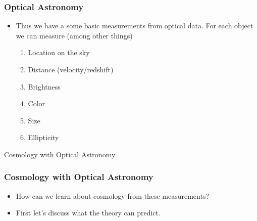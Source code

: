 \documentclass{beamer}
\begin{document}
\frame
{

    \frametitle{Optical Astronomy}


    \begin{itemize}

        \item Thus we have a some basic measurements from optical data.  For
            each object we can measure (among other things)

            \begin{enumerate}

                \item Location on the sky

                \item Distance (velocity/redshift)

                \item Brightness

                \item Color

                \item Size

                \item Ellipticity

            \end{enumerate}


    \end{itemize}

}

\frame
{

    {\huge Cosmology with Optical Astronomy}

}


\frame
{

    \frametitle{Cosmology with Optical Astronomy}


    \begin{itemize}

        \item How can we learn about cosmology from these measurements?

        \item First let's discuss what the theory can predict.

    \end{itemize}

}
\end{document}
